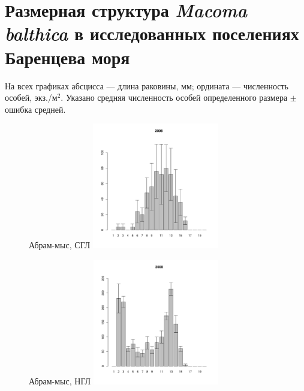 \section{Размерная структура {\it Macoma balthica} в исследованных поселениях Баренцева моря} 
\label{app:Barents_sizestr_hist}
На всех графиках абсцисса --- длина раковины, мм; ордината --- численность особей, экз./м$^2$. Указано средняя численность особей определенного размера $\pm$ ошибка средней.

	\begin{figure}[hp]
	
	\begin{minipage}[b]{.46\linewidth}
	\begin{center}
	{\footnotesize Абрам-мыс, СГЛ}
		\includegraphics[width=55mm]{../Barenc_Sea/Abram-mys/middle_2008_.pdf}
	\end{center}
	\end{minipage}
	\hfil %
	\begin{minipage}[b]{.46\linewidth}
	\begin{center}
	{\footnotesize Абрам-мыс, НГЛ}
		\includegraphics[width=55mm]{../Barenc_Sea/Abram-mys/low_2008_.pdf}
	\end{center}
	\end{minipage}
	\begin{minipage}[b]{.46\linewidth}
	\begin{center}

\end{center}
\end{minipage}
\end{figure}
